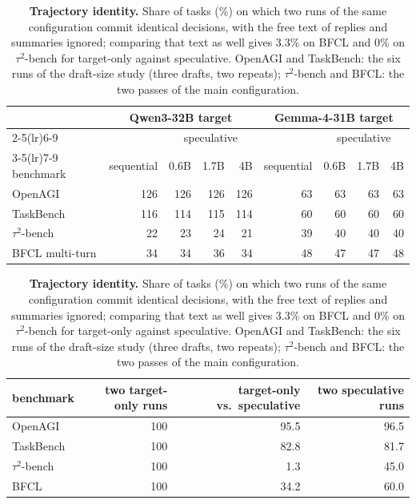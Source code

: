 \begin{table}[!ht]
\centering
\caption{\textbf{Task outcomes per arm} for the configurations of Table~\ref{tab:four}.
Counts denote normal termination on OpenAGI and TaskBench, and official task success on
$\tau^2$-bench and BFCL. The sequential count is the same across the three draft-size comparisons.}
\label{tab:success}
\small
\begin{tabular}{lrrrrrrrr}
\toprule
 & \multicolumn{4}{c}{Qwen3-32B target} & \multicolumn{4}{c}{Gemma-4-31B target} \\
\cmidrule(lr){2-5}\cmidrule(lr){6-9}
 & & \multicolumn{3}{c}{speculative} & & \multicolumn{3}{c}{speculative} \\
\cmidrule(lr){3-5}\cmidrule(lr){7-9}
benchmark & sequential & 0.6B & 1.7B & 4B & sequential & 0.6B & 1.7B & 4B \\
\midrule
OpenAGI         & 126 & 126 & 126 & 126 & 63 & 63 & 63 & 63 \\
TaskBench       & 116 & 114 & 115 & 114 & 60 & 60 & 60 & 60 \\
$\tau^2$-bench  &  22 &  23 &  24 &  21 & 39 & 40 & 40 & 40 \\
BFCL multi-turn &  34 &  34 &  36 &  34 & 48 & 47 & 47 & 48 \\
\bottomrule
\end{tabular}

\vspace{1.5em}
\caption{\textbf{Trajectory identity.} Share of tasks (\%) on which two runs of the same configuration commit
identical decisions, with the free text of replies and summaries ignored; comparing that text as well gives
3.3\% on BFCL and 0\% on $\tau^2$-bench for target-only against speculative. OpenAGI and TaskBench: the six
runs of the draft-size study (three drafts, two repeats); $\tau^2$-bench and BFCL: the two passes of the main
configuration.}
\label{tab:parity}
\small
\begin{tabular}{lrrr}
\toprule
benchmark & two target-only runs & target-only vs.\ speculative & two speculative runs \\
\midrule
OpenAGI        & 100 & 95.5 & 96.5 \\
TaskBench      & 100 & 82.8 & 81.7 \\
$\tau^2$-bench & 100 &  1.3 & 45.0 \\
BFCL           & 100 & 34.2 & 60.0 \\
\bottomrule
\end{tabular}
\end{table}
